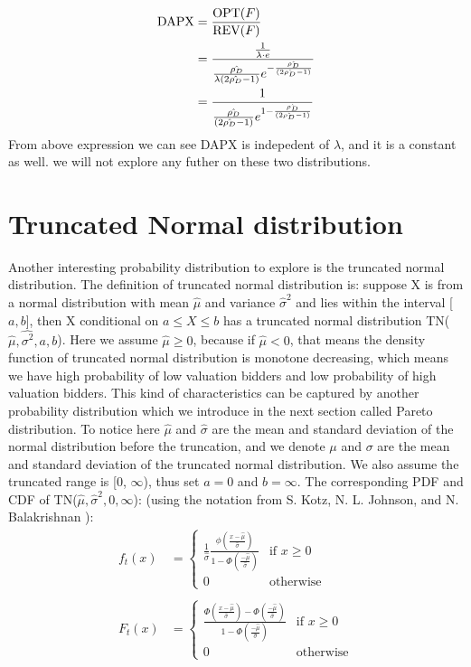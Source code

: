 \begin{equation}\notag
\begin{split}	
	\text{DAPX} &= \frac{\text{OPT}(F)}{\text{REV}(F)} \\&= \frac{\frac{1}{\lambda \cdot e}}{\frac{\hat{\rho_D}}{\lambda (2\hat{\rho_D} - 1)}e^{- \frac{\hat{\rho_D}}{(2\hat{\rho_D} - 1)}}} \\&= \frac{1}{\frac{\hat{\rho_D}}{(2\hat{\rho_D} - 1)}e^{1- \frac{\hat{\rho_D}}{(2\hat{\rho_D} - 1)}}}
\end{split}
\end{equation} 
From above expression we can see DAPX is indepedent of $\lambda$, and it is a constant as well. 
we will not explore any futher on these two distributions.


\section{Truncated Normal distribution} \label{Normal distribution} 
Another interesting probability distribution to explore is the truncated normal distribution. The definition of truncated normal distribution is: suppose X is from a normal distribution with mean $\hat{\mu}$ and variance $\hat{\sigma}^2$ and lies within the interval [$a,b$], then X conditional on $a \leqslant X  \leqslant b$ has a truncated normal distribution TN($\hat{\mu}, \hat{\sigma^2}, a,b$). Here we assume $\hat{\mu} \geqslant0 $, because if $\hat{\mu} <0$, that means the density function of truncated normal distribution is monotone decreasing, which means we have high probability of low valuation bidders and low probability of high valuation bidders. This kind of characteristics can be captured by another probability distribution which we introduce in the next section called Pareto distribution. To notice here $\hat{\mu}$ and $\hat{\sigma}$ are the mean and standard deviation of the normal distribution before the truncation, and we denote $\mu$ and $\sigma$ are the mean and standard deviation of the truncated normal distribution. We also assume the truncated range is [0, $\infty$), thus set $a = 0$ and $b = \infty$. The corresponding PDF and CDF of TN($\hat{\mu}, \hat{\sigma}^2, 0,\infty$): (using the notation from S. Kotz, N. L. Johnson, and N. Balakrishnan \cite{kotz1994continuous}):
\begin{align*}
	f_t(x) &=\begin{cases}
			\frac{1}{\hat{\sigma}} \frac{\phi(\frac{x- \hat{\mu}}{\hat{\sigma}})}{1 - \Phi(\frac{- \hat{\mu}}{\hat{\sigma}})}  & \text{if }  x \geqslant 0 \\ 0 & \text{otherwise}
			\end{cases}\\ \\
	F_t(x) &= \begin{cases}	
			\frac{\Phi(\frac{x- \hat{\mu}}{\hat{\sigma}}) - \Phi(\frac{- \hat{\mu}}{\hat{\sigma}})}{1 - \Phi(\frac{- \hat{\mu}}{\hat{\sigma}})}  & \text{if } x \geqslant 0 \\ 0 & \text{otherwise}
			\end{cases} 
\end{align*}
